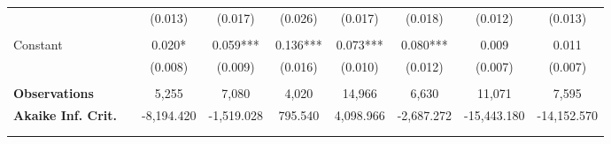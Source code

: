 \begin{tabular*}{\linewidth}{@{\extracolsep{\fill} } llccccccc}
&&(0.013)&(0.017)&(0.026)&(0.017)&(0.018)&(0.012)&(0.013)\\%
\arrayrulecolor{white}%
\hline%
\arrayrulecolor{white}%
\hline%
\arrayrulecolor{white}%
\hline%
\arrayrulecolor{white}%
\hline%
\arrayrulecolor{white}%
\hline%
&&&&&&&&\\%
\multirow{2}{*}{Constant}&&0.020*&0.059***&0.136***&0.073***&0.080***&0.009&0.011\\%
&&(0.008)&(0.009)&(0.016)&(0.010)&(0.012)&(0.007)&(0.007)\\%
\arrayrulecolor{white}%
\hline%
\arrayrulecolor{white}%
\hline%
\arrayrulecolor{white}%
\hline%
\arrayrulecolor{white}%
\hline%
\arrayrulecolor{white}%
\hline%
&&&&&&&&\\%
\bfseries Observations&&5,255&7,080&4,020&14,966&6,630&11,071&7,595\\%
\bfseries Akaike Inf. Crit.&&{-}8,194.420&{-}1,519.028&795.540&4,098.966&{-}2,687.272&{-}15,443.180&{-}14,152.570\\%
\arrayrulecolor{white}%
\hline%
\arrayrulecolor{white}%
\hline%
\arrayrulecolor{white}%
\hline%
\arrayrulecolor{white}%
\hline%
\arrayrulecolor{white}%
\hline%
&&&&&&&&\\%
\arrayrulecolor{black}%
\hline%
\end{tabular*}